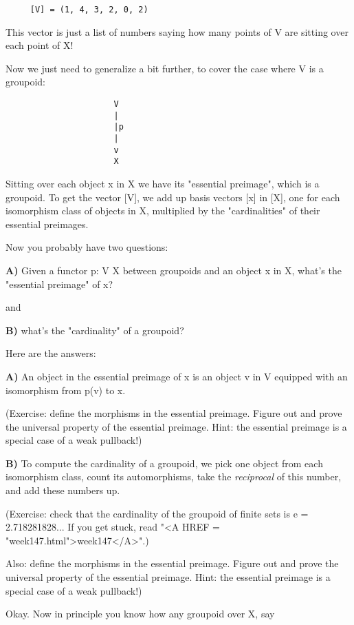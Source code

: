 \begin{verbatim}
     [V] = (1, 4, 3, 2, 0, 2)
\end{verbatim}
    
This vector is just a list of numbers saying how many points of V 
are sitting over each point of X!

Now we just need to generalize a bit further, to cover the case
where V is a groupoid:

\begin{verbatim}
                      V
                      |
                      |p
                      |
                      v
                      X
\end{verbatim}
    
Sitting over each object x in X we have its "essential preimage",
which is a groupoid.  To get the vector [V], we add up basis 
vectors [x] in [X], one for each isomorphism class of objects 
in X, multiplied by the "cardinalities" of their essential preimages.

Now you probably have two questions: 

\textbf{A)} Given a functor p: V \to  X between groupoids and an object
x in X, what's the "essential preimage" of x?

and 

\textbf{B)} what's the "cardinality" of a groupoid?

Here are the answers:

\textbf{A)} An object in the essential preimage of x is an object 
v in V equipped with an isomorphism from p(v) to x.                        

(Exercise: define the morphisms in the essential preimage.
Figure out and prove the universal property of the essential
preimage.  Hint: the essential preimage is a special case of a
weak pullback!)

\textbf{B)} To compute the cardinality of a groupoid, we pick one object
from each isomorphism class, count its automorphisms, take the 
\emph{reciprocal} of this number, and add these numbers up.

(Exercise: check that the cardinality of the groupoid of finite
sets is e = 2.718281828...  If you get stuck, read "<A HREF = "week147.html">week147</A>".)

Also: define the morphisms in the essential preimage.  Figure out 
and prove the universal property of the essential preimage.  Hint: 
the essential preimage is a special case of a weak pullback!)

Okay.  Now in principle you know how any groupoid over X, say

